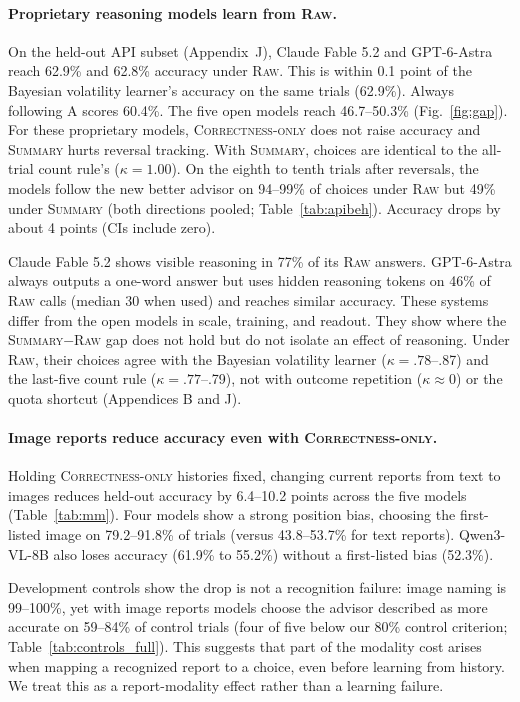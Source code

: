 \documentclass[letterpaper]{article} %
\newcommand{\Raw}{\textsc{Raw}}
\newcommand{\CorrectnessOnly}{\textsc{Correctness-only}}
\newcommand{\Summary}{\textsc{Summary}}
\begin{document}
\paragraph{Proprietary reasoning models learn from \Raw{}.} On the held-out API subset (Appendix~J), Claude Fable 5.2 and GPT-6-Astra reach 62.9\% and 62.8\% accuracy under \Raw{}. This is within 0.1 point of the Bayesian volatility learner's accuracy on the same trials (62.9\%). Always following A scores 60.4\%. The five open models reach 46.7--50.3\% (Fig.~\ref{fig:gap}). For these proprietary models, \CorrectnessOnly{} does not raise accuracy and \Summary{} hurts reversal tracking. With \Summary{}, choices are identical to the all-trial count rule's ($\kappa=1.00$). On the eighth to tenth trials after reversals, the models follow the new better advisor on 94--99\% of choices under \Raw{} but 49\% under \Summary{} (both directions pooled; Table~\ref{tab:apibeh}). Accuracy drops by about 4 points (CIs include zero).

Claude Fable 5.2 shows visible reasoning in 77\% of its \Raw{} answers. GPT-6-Astra always outputs a one-word answer but uses hidden reasoning tokens on 46\% of \Raw{} calls (median 30 when used) and reaches similar accuracy. These systems differ from the open models in scale, training, and readout. They show where the \Summary{}$-$\Raw{} gap does not hold but do not isolate an effect of reasoning. Under \Raw{}, their choices agree with the Bayesian volatility learner ($\kappa=.78$--.87) and the last-five count rule ($\kappa=.77$--.79), not with outcome repetition ($\kappa\approx 0$) or the quota shortcut (Appendices B and J).

\paragraph{Image reports reduce accuracy even with \CorrectnessOnly{}.} Holding \CorrectnessOnly{} histories fixed, changing current reports from text to images reduces held-out accuracy by 6.4--10.2 points across the five models (Table~\ref{tab:mm}). Four models show a strong position bias, choosing the first-listed image on 79.2--91.8\% of trials (versus 43.8--53.7\% for text reports). Qwen3-VL-8B also loses accuracy (61.9\% to 55.2\%) without a first-listed bias (52.3\%).

Development controls show the drop is not a recognition failure: image naming is 99--100\%, yet with image reports models choose the advisor described as more accurate on 59--84\% of control trials (four of five below our 80\% control criterion; Table~\ref{tab:controls_full}). This suggests that part of the modality cost arises when mapping a recognized report to a choice, even before learning from history. We treat this as a report-modality effect rather than a learning failure.
\end{document}
